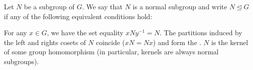 \begin{definition}\label{def:normal_subgroup}
  Let \( N \) be a subgroup of \( G \). We say that \( N \) is a normal subgroup and write \( N \unlhd G \) if any of the following equivalent conditions hold:
  \begin{defenum}
     For any \( x \in G \), we have the set equality \( x N y^{-1} = N \).
     The partitions induced by the left and rights cosets of \( N \) coincide (\( xN = Nx \)) and form the .
     \( N \) is the kernel of some group homomorphism (in particular, kernels are always normal subgroups).
  \end{defenum}
\end{definition}
